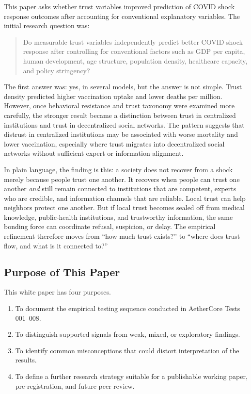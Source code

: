 \documentclass[12pt]{article}
\begin{document}
This paper asks whether trust variables improved prediction of COVID shock response outcomes after accounting for conventional explanatory variables. The initial research question was:

\begin{quote}
Do measurable trust variables independently predict better COVID shock response after controlling for conventional factors such as GDP per capita, human development, age structure, population density, healthcare capacity, and policy stringency?
\end{quote}

The first answer was: yes, in several models, but the answer is not simple. Trust density predicted higher vaccination uptake and lower deaths per million. However, once behavioral resistance and trust taxonomy were examined more carefully, the stronger result became a distinction between trust in centralized institutions and trust in decentralized social networks. The pattern suggests that distrust in centralized institutions may be associated with worse mortality and lower vaccination, especially where trust migrates into decentralized social networks without sufficient expert or information alignment.

In plain language, the finding is this: a society does not recover from a shock merely because people trust one another. It recovers when people can trust one another \textit{and} still remain connected to institutions that are competent, experts who are credible, and information channels that are reliable. Local trust can help neighbors protect one another. But if local trust becomes sealed off from medical knowledge, public-health institutions, and trustworthy information, the same bonding force can coordinate refusal, suspicion, or delay. The empirical refinement therefore moves from ``how much trust exists?'' to ``where does trust flow, and what is it connected to?''

\subsection{Purpose of This Paper}

This white paper has four purposes.

\begin{enumerate}
  \item To document the empirical testing sequence conducted in AetherCore Tests 001--008.
  \item To distinguish supported signals from weak, mixed, or exploratory findings.
  \item To identify common misconceptions that could distort interpretation of the results.
  \item To define a further research strategy suitable for a publishable working paper, pre-registration, and future peer review.
\end{enumerate}
\end{document}
